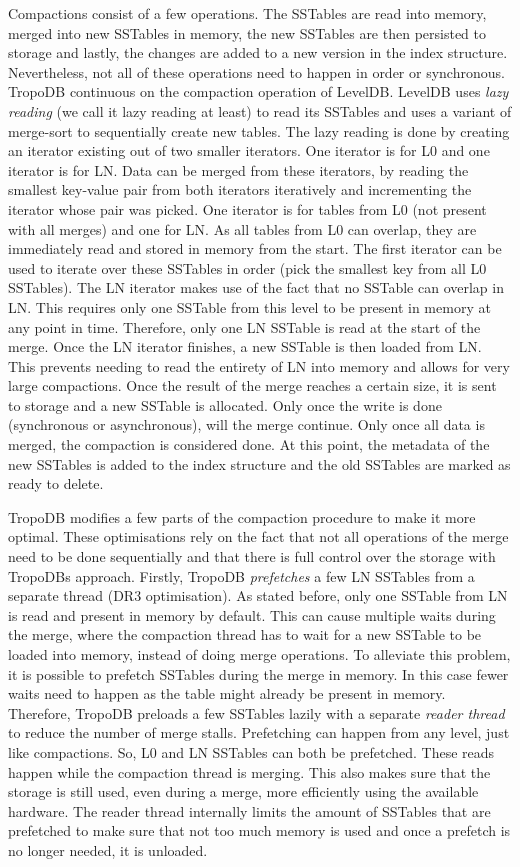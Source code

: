 Compactions consist of a few operations. The SSTables are read into memory, merged into new SSTables in memory, the new SSTables are then persisted to storage and lastly, the changes are added to a new version in the index structure. Nevertheless, not all of these operations need to happen in order or synchronous. TropoDB continuous on the compaction operation of LevelDB. LevelDB uses \textit{lazy reading} (we call it lazy reading at least) to read its SSTables and uses a variant of merge-sort to sequentially create new tables. The lazy reading is done by creating an iterator existing out of two smaller iterators. One iterator is for L0 and one iterator is for LN. Data can be merged from these iterators, by reading the smallest key-value pair from both iterators iteratively and incrementing the iterator whose pair was picked. One iterator is for tables from L0 (not present with all merges) and one for LN. As all tables from L0 can overlap, they are immediately read and stored in memory from the start. The first iterator can be used to iterate over these SSTables in order (pick the smallest key from all L0 SSTables). The LN iterator makes use of the fact that no SSTable can overlap in LN. This requires only one SSTable from this level to be present in memory at any point in time. Therefore, only one LN SSTable is read at the start of the merge. Once the LN iterator finishes, a new SSTable is then loaded from LN. This prevents needing to read the entirety of LN into memory and allows for very large compactions. Once the result of the merge reaches a certain size, it is sent to storage and a new SSTable is allocated. Only once the write is done (synchronous or asynchronous), will the merge continue. Only once all data is merged, the compaction is considered done. At this point, the metadata of the new SSTables is added to the index structure and the old SSTables are marked as ready to delete.

TropoDB modifies a few parts of the compaction procedure to make it more optimal. These optimisations rely on the fact that not all operations of the merge need to be done sequentially and that there is full control over the storage with TropoDBs approach. Firstly, TropoDB \textit{prefetches} a few LN SSTables from a separate thread (DR3 optimisation). As stated before, only one SSTable from LN is read and present in memory by default. This can cause multiple waits during the merge, where the compaction thread has to wait for a new SSTable to be loaded into memory, instead of doing merge operations. To alleviate this problem, it is possible to prefetch SSTables during the merge in memory. In this case fewer waits need to happen as the table might already be present in memory. Therefore, TropoDB preloads a few SSTables lazily with a separate \textit{reader thread} to reduce the number of merge stalls. Prefetching can happen from any level, just like compactions. So, L0 and LN SSTables can both be prefetched. These reads happen while the compaction thread is merging. This also makes sure that the storage is still used, even during a merge, more efficiently using the available hardware. The reader thread internally limits the amount of SSTables that are prefetched to make sure that not too much memory is used and once a prefetch is no longer needed, it is unloaded.

